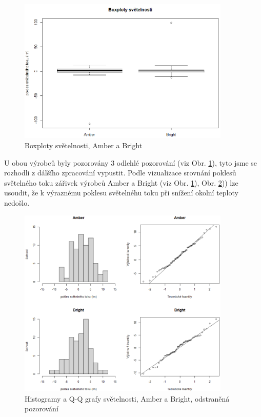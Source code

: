 \documentclass[czech]{article}%
\begin{document}
\begin{figure}[H]
	\centering
	\includegraphics[width=0.9\textwidth]{Figures/Boxploty_2.png}
	\caption[Boxploty světelnosti, Amber a Bright]{Boxploty světelnosti, Amber a Bright}
	\label{fig:Boxplot2}
\end{figure}

U obou výrobců byly pozorovány 3 odlehlé pozorování (viz Obr. \ref{fig:Boxplot2}), tyto jsme se rozhodli z dálšího zpracování vypustit. 
Podle vizualizace srovnání poklesů světelného toku zářivek výrobců Amber a Bright (viz Obr. \ref{fig:Boxplot2}), Obr. \ref{fig:QQaHist})) lze usoudit, že k výraznému poklesu 
světelnéhu toku při snížení okolní teploty nedošlo.

\begin{figure}[H]
	\centering
	\includegraphics[width=0.9\textwidth]{Figures/QQaHistogram.png}
	\caption[Histogramy a Q-Q grafy světelnosti]{Histogramy a Q-Q grafy světelnosti, Amber a Bright, odstraněná pozorování}
	\label{fig:QQaHist}
\end{figure}
\end{document}
